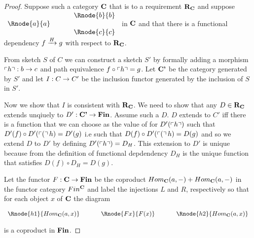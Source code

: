 \begin{proof}
Suppose such a category  $\catc$  that  is 
 to a requirement $\reqtc$ and suppose
$
\begin{array}{c p{0.5cm} c  }
             &&   \Rnode{b}{b} \\[0.01cm]
\Rnode{a}{a} &&                \\[0.01cm] 
             &&   \Rnode{c}{c}         
\end{array} 
$
in $\catc$ 
and that there is a functional dependency $\fundep{H}{f}{g}$ with respect to $\reqtc$.

From sketch $S$ of $C$ we can construct a sketch $S'$ by formally adding a morphism $\qq{h}: b \morph c$
and path equivalence $f \circ \qq{h} = g$. Let $\catcp$ be the category generated by $S'$ and
let $I: C \morph C'$ be the inclusion functor generated by the inclusion of $S$ in $S'$. 


Now we show that $I$ is consistent with $\reqtc$. We need to show that any $D \in \reqtc$
extends unqiuely to $D' :\catcp \morph \Fin$. Assume such a $D$. 
$D$  extends to $C'$ iff there is a  function that we can choose as the value of  for $D'(\qq{h})$  such that $D'(f) \circ D'(\qq(h) = D'(g)$ i.e such that
$D(f) \circ D'(\qq(h) = D(g)$ and so we  extend $D$ to $D'$ 
 by defining $D'(\qq{h})=D_H$.
This extension to $D'$ is unique because from the definition of functional depdendency
$D_H$ is the unique function that satisfies $D(f) \circ D_H = D(g)$.


Let the functor $F: \catc \morph \Fin$ be the coproduct $Hom_{\catc}(a,-) + Hom_{\catc}(a,-)$
in the functor category $Fin^{\catc}$ and label the injections $L$ and $R$, respectively so that
for each object $x$ of $\catc$ the diagram
\begin{center}
$
\begin{array}{c p{0.5cm} c p{0.5cm} c  }
\Rnode{h1}{Hom_{\catc}(a,x)}  &&\Rnode{Fx}{F(x)}  &&   \Rnode{h2}{Hom_{\catc}(a,x)}       
\end{array} 
$
\end{center}
is a coproduct in $\Fin$.


\end{proof}
